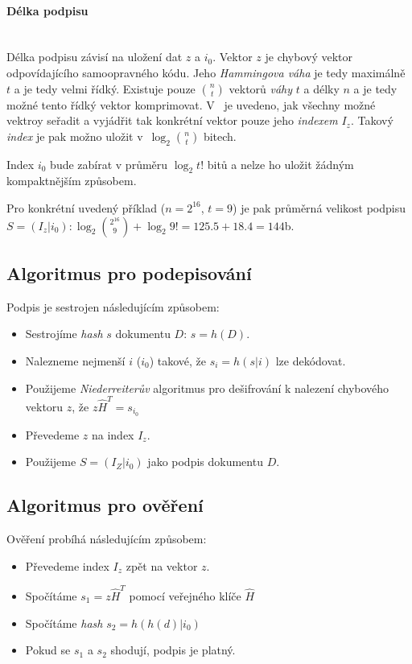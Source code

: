 \documentclass[thesis=M,czech,hidelinks]{FITthesis}[2012/06/26]
\newcommand{\0}{{\textcolor[gray]{0.80}{0}}}
\begin{document}
\paragraph{Délka podpisu} \hfil \\
Délka podpisu závisí na uložení dat $z$ a $i_0$. Vektor $z$ je chybový vektor
odpovídajícího samoopravného kódu. Jeho \emph{Hammingova váha} je tedy maximálně
$t$ a je tedy velmi řídký. Existuje pouze $\binom{n}{t}$ vektorů \emph{váhy} $t$ a
délky $n$ a je tedy možné tento řídký vektor komprimovat. V~\cite{Courtois} je
uvedeno, jak všechny možné vektroy seřadit a vyjádřit tak konkrétní vektor pouze
jeho \emph{indexem} $I_z$. Takový \emph{index} je pak možno uložit
v~$\log_2{\binom{n}{t}}$ bitech.

Index $i_0$ bude zabírat v průměru $\log_2{t!}$ bitů a nelze ho uložit žádným
kompaktnějším způsobem.

Pro konkrétní uvedený příklad ($n=2^{16}$, $t=9$) je pak průměrná velikost
podpisu $S = ( I_z | i_0 ): \log_2{\binom{2^{16}}{9}} + \log_2{9!} = 125.5 + 18.4 =
144$\;b.

\subsection{Algoritmus pro podepisování}
Podpis je sestrojen následujícím způsobem:

\begin{itemize}
    \item Sestrojíme \emph{hash} $s$ dokumentu $D$: $s = h(D)$.
    \item Nalezneme nejmenší $i$ ($i_0$) takové, že $s_i = h(s|i)$ lze dekódovat.
    \item Použijeme \emph{Niederreiterův} algoritmus pro dešifrování k nalezení
        chybového vektoru $z$, že $z\hat{H}^T = s_{i_0}$
    \item Převedeme $z$ na index $I_z$.
    \item Použijeme $S=(I_Z|i_0)$ jako podpis dokumentu $D$.
\end{itemize}

\subsection{Algoritmus pro ověření}
Ověření probíhá následujícím způsobem:

\begin{itemize}
    \item Převedeme index $I_z$ zpět na vektor $z$.
    \item Spočítáme $s_1 = z\hat{H}^T$ pomocí veřejného klíče $\hat{H}$
    \item Spočítáme \emph{hash} $s_2 = h(h(d)|i_0)$
    \item Pokud se $s_1$ a $s_2$ shodují, podpis je platný.
\end{itemize}
\end{document}
